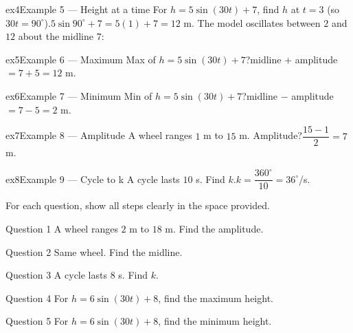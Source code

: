 \documentclass[11pt]{article}
\begin{document}
\begin{example}{ex4}{Example 5 --- Height at a time}
For $h=5\sin(30t)+7$, find $h$ at $t=3$ (so $30t=90^\circ$).\soln $5\sin90^\circ+7=5(1)+7=12$ m. The model oscillates between $2$ and $12$ about the midline $7$:
\end{example}

\begin{example}{ex5}{Example 6 --- Maximum}
Max of $h=5\sin(30t)+7$?\soln midline $+$ amplitude $=7+5=12$ m.
\end{example}

\begin{example}{ex6}{Example 7 --- Minimum}
Min of $h=5\sin(30t)+7$?\soln midline $-$ amplitude $=7-5=2$ m.
\end{example}

\begin{example}{ex7}{Example 8 --- Amplitude}
A wheel ranges $1$ m to $15$ m. Amplitude?\soln $\dfrac{15-1}{2}=7$ m.
\end{example}

\begin{example}{ex8}{Example 9 --- Cycle to k}
A cycle lasts $10$ s. Find $k$.\soln $k=\dfrac{360^\circ}{10}=36^\circ$/s.
\end{example}

\clearpage
{}
For each question, show all steps clearly in the space provided.

\begin{qbox}{Question 1}
A wheel ranges $2$ m to $18$ m. Find the amplitude.\workspace{2.4cm}
\end{qbox}

\begin{qbox}{Question 2}
Same wheel. Find the midline.\workspace{2.4cm}
\end{qbox}

\begin{qbox}{Question 3}
A cycle lasts $8$ s. Find $k$.\workspace{2.4cm}
\end{qbox}

\begin{qbox}{Question 4}
For $h=6\sin(30t)+8$, find the maximum height.\workspace{2.4cm}
\end{qbox}

\begin{qbox}{Question 5}
For $h=6\sin(30t)+8$, find the minimum height.\workspace{2.4cm}
\end{qbox}
\end{document}
